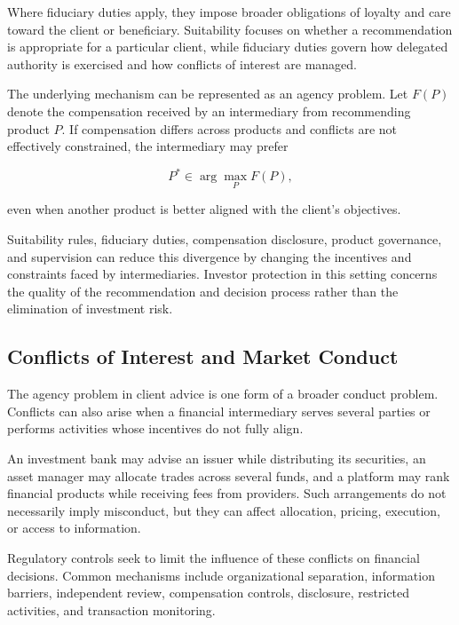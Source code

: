Where fiduciary duties apply, they impose broader obligations of loyalty and care toward the client or beneficiary. Suitability focuses on whether a recommendation is appropriate for a particular client, while fiduciary duties govern how delegated authority is exercised and how conflicts of interest are managed.

The underlying mechanism can be represented as an agency problem. Let \(F(P)\) denote the compensation received by an intermediary from recommending product \(P\). If compensation differs across products and conflicts are not effectively constrained, the intermediary may prefer

\begin{equation}
P^{*}
\in
\arg\max_P F(P),
\label{eq:ch23-conflicted-choice}
\end{equation}

even when another product is better aligned with the client's objectives.

Suitability rules, fiduciary duties, compensation disclosure, product governance, and supervision can reduce this divergence by changing the incentives and constraints faced by intermediaries. Investor protection in this setting concerns the quality of the recommendation and decision process rather than the elimination of investment risk.


\subsection{Conflicts of Interest and Market Conduct}

The agency problem in client advice is one form of a broader conduct problem. Conflicts can also arise when a financial intermediary serves several parties or performs activities whose incentives do not fully align.

An investment bank may advise an issuer while distributing its securities, an asset manager may allocate trades across several funds, and a platform may rank financial products while receiving fees from providers. Such arrangements do not necessarily imply misconduct, but they can affect allocation, pricing, execution, or access to information.

Regulatory controls seek to limit the influence of these conflicts on financial decisions. Common mechanisms include organizational separation, information barriers, independent review, compensation controls, disclosure, restricted activities, and transaction monitoring.

